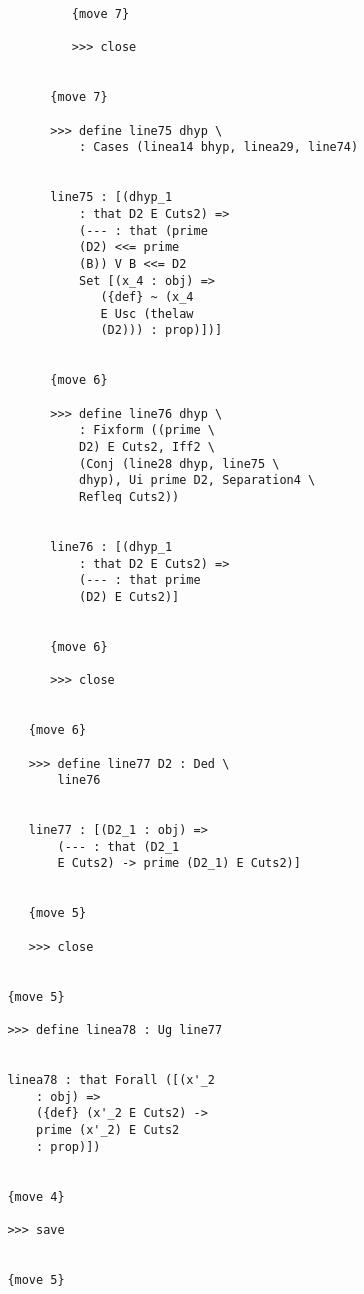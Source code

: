 \documentclass[12pt]{article}
\begin{document}
\begin{verbatim}
                        {move 7}

                        >>> close


                     {move 7}

                     >>> define line75 dhyp \
                         : Cases (linea14 bhyp, linea29, line74)


                     line75 : [(dhyp_1 
                         : that D2 E Cuts2) => 
                         (--- : that (prime 
                         (D2) <<= prime 
                         (B)) V B <<= D2 
                         Set [(x_4 : obj) => 
                            ({def} ~ (x_4 
                            E Usc (thelaw 
                            (D2))) : prop)])]


                     {move 6}

                     >>> define line76 dhyp \
                         : Fixform ((prime \
                         D2) E Cuts2, Iff2 \
                         (Conj (line28 dhyp, line75 \
                         dhyp), Ui prime D2, Separation4 \
                         Refleq Cuts2))


                     line76 : [(dhyp_1 
                         : that D2 E Cuts2) => 
                         (--- : that prime 
                         (D2) E Cuts2)]


                     {move 6}

                     >>> close


                  {move 6}

                  >>> define line77 D2 : Ded \
                      line76


                  line77 : [(D2_1 : obj) => 
                      (--- : that (D2_1 
                      E Cuts2) -> prime (D2_1) E Cuts2)]


                  {move 5}

                  >>> close


               {move 5}

               >>> define linea78 : Ug line77


               linea78 : that Forall ([(x'_2 
                   : obj) => 
                   ({def} (x'_2 E Cuts2) -> 
                   prime (x'_2) E Cuts2 
                   : prop)])


               {move 4}

               >>> save


               {move 5}


\end{verbatim}
\end{document}

